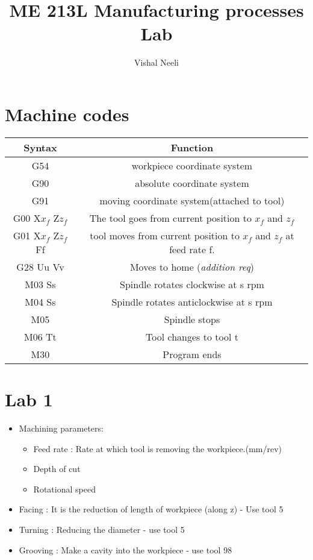 \documentclass{article}
\title{ME 213L Manufacturing processes Lab}
\author{Vishal Neeli}
\begin{document}
\maketitle

\section{Machine codes}
\begin{tabular}{|c|c|}
	\hline
	Syntax & Function\\
	\hline
	G54 & workpiece coordinate system\\
	G90 & absolute coordinate system\\
	G91 & moving coordinate system(attached to tool)\\
	\hline
	G00 X$x_f$ Z$z_f$ & The tool goes from current position to $x_f$ and $z_f$\\
	G01 X$x_f$ Z$z_f$ Ff & tool moves from current position to $x_f$ and $z_f$ at feed rate f.\\
	G28 Uu Vv & Moves to home (\emph{addition req})\\
	\hline
	M03 Ss & Spindle rotates clockwise at s rpm\\
	M04 Ss & Spindle rotates anticlockwise at s rpm\\
	M05 & Spindle stops\\
	M06 Tt & Tool changes to tool t\\
	M30 & Program ends\\
	\hline
	
\end{tabular}


\section{Lab 1}

\begin{itemize}

	\item Machining parameters:
	\begin{itemize}
	\item Feed rate : Rate at which tool is removing the workpiece.(mm/rev)
	\item Depth of cut
	\item Rotational speed
	\end{itemize}

	\item Facing : It is the reduction of length of workpiece (along z) - Use tool 5
	\item Turning : Reducing the diameter - use tool 5
	\item Grooving : Make a cavity into the workpiece - use tool 98










\end{itemize}
\end{document}
